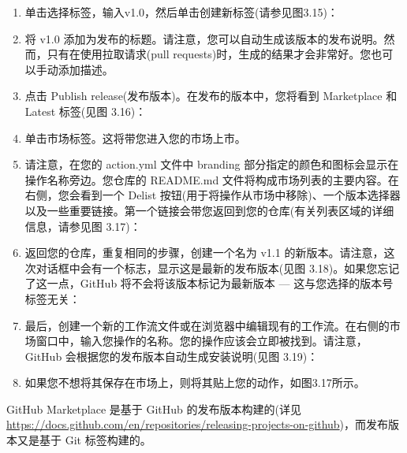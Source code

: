 \begin{enumerate}
\item 
单击选择标签，输入v1.0，然后单击创建新标签(请参见图3.15)：


\item 
将 v1.0 添加为发布的标题。请注意，您可以自动生成该版本的发布说明。然而，只有在使用拉取请求(pull requests)时，生成的结果才会非常好。您也可以手动添加描述。

\item 
点击 Publish release(发布版本)。在发布的版本中，您将看到 Marketplace 和 Latest 标签(见图 3.16)：


\item 
单击市场标签。这将带您进入您的市场上市。

\item 
请注意，在您的 action.yml 文件中 branding 部分指定的颜色和图标会显示在操作名称旁边。您仓库的 README.md 文件将构成市场列表的主要内容。在右侧，您会看到一个 Delist 按钮(用于将操作从市场中移除)、一个版本选择器以及一些重要链接。第一个链接会带您返回到您的仓库(有关列表区域的详细信息，请参见图 3.17)：


\item 
返回您的仓库，重复相同的步骤，创建一个名为 v1.1 的新版本。请注意，这次对话框中会有一个标志，显示这是最新的发布版本(见图 3.18)。如果您忘记了这一点，GitHub 将不会将该版本标记为最新版本 --- 这与您选择的版本号标签无关：


\item 
最后，创建一个新的工作流文件或在浏览器中编辑现有的工作流。在右侧的市场窗口中，输入您操作的名称。您的操作应该会立即被找到。请注意，GitHub 会根据您的发布版本自动生成安装说明(见图 3.19)：


\item 
如果您不想将其保存在市场上，则将其贴上您的动作，如图3.17所示。
\end{enumerate}


GitHub Marketplace 是基于 GitHub 的发布版本构建的(详见 \url{https://docs.github.com/en/repositories/releasing-projects-on-github})，而发布版本又是基于 Git 标签构建的。

